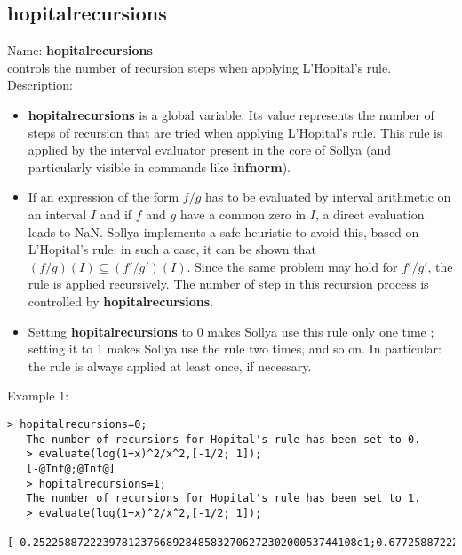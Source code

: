 \subsection{ hopitalrecursions }
\noindent Name: \textbf{hopitalrecursions}\\
controls the number of recursion steps when applying L'Hopital's rule.\\

\noindent Description: \begin{itemize}

\item \textbf{hopitalrecursions} is a global variable. Its value represents the number of steps of
   recursion that are tried when applying L'Hopital's rule. This rule is applied
   by the interval evaluator present in the core of Sollya (and particularly
   visible in commands like \textbf{infnorm}).

\item If an expression of the form $f/g$ has to be evaluated by interval 
   arithmetic on an interval $I$ and if $f$ and $g$ have a common zero
   in $I$, a direct evaluation leads to NaN.
   Sollya implements a safe heuristic to avoid this, based on L'Hopital's rule: in 
   such a case, it can be shown that $(f/g)(I) \subseteq (f'/g')(I)$. Since
   the same problem may hold for $f'/g'$, the rule is applied recursively.
   The number of step in this recursion process is controlled by \textbf{hopitalrecursions}.

\item Setting \textbf{hopitalrecursions} to 0 makes Sollya use this rule only one time ;
   setting it to 1 makes Sollya use the rule two times, and so on.
   In particular: the rule is always applied at least once, if necessary.
\end{itemize}
\noindent Example 1: 
\begin{center}\begin{minipage}{14.8cm}\begin{Verbatim}[frame=single]
   > hopitalrecursions=0;
   The number of recursions for Hopital's rule has been set to 0.
   > evaluate(log(1+x)^2/x^2,[-1/2; 1]);
   [-@Inf@;@Inf@]
   > hopitalrecursions=1;
   The number of recursions for Hopital's rule has been set to 1.
   > evaluate(log(1+x)^2/x^2,[-1/2; 1]);
   [-0.252258872223978123766892848583270627230200053744108e1;0.677258872223978123766892848583270627230200053744116e1]
\end{Verbatim}
\end{minipage}\end{center}
